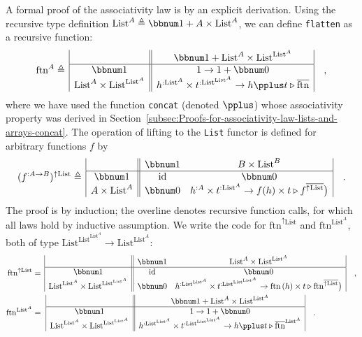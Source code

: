 A formal proof of the associativity law is by an explicit derivation.
Using the recursive type definition $\text{List}^{A}\triangleq\bbnum 1+A\times\text{List}^{A}$,
we can define \lstinline!flatten! as a recursive function:
\[
\text{ftn}^{A}\triangleq\,\begin{array}{|c||c|}
 & \bbnum 1+\text{List}^{A}\times\text{List}^{\text{List}^{A}}\\
\hline \bbnum 1 & 1\rightarrow1+\bbnum 0\\
\text{List}^{A}\times\text{List}^{\text{List}^{A}} & h^{:\text{List}^{A}}\times t^{:\text{List}^{\text{List}^{A}}}\rightarrow h\pplus t\triangleright\overline{\text{ftn}}
\end{array}\quad,
\]
where we have used the function \lstinline!concat! (denoted $\pplus$)
whose associativity property was derived in Section~\ref{subsec:Proofs-for-associativity-law-lists-and-arrays-concat}.
The operation of lifting to the \lstinline!List! functor is defined
for arbitrary functions $f$ by
\[
(f^{:A\rightarrow B})^{\uparrow\text{List}}\triangleq\,\begin{array}{|c||cc|}
 & \bbnum 1 & B\times\text{List}^{B}\\
\hline \bbnum 1 & \text{id} & \bbnum 0\\
A\times\text{List}^{A} & \bbnum 0 & h^{:A}\times t^{:\text{List}^{A}}\rightarrow f(h)\times t\triangleright f^{\overline{\uparrow\text{List}}}\big)
\end{array}\quad.
\]
The proof is by induction; the overline denotes recursive function
calls, for which all laws hold by inductive assumption. We write the
code for $\text{ftn}^{\uparrow\text{List}}$ and $\text{ftn}^{\text{List}^{A}}$,
both of type $\text{List}^{\text{List}^{\text{List}^{A}}}\rightarrow\text{List}^{\text{List}^{A}}$:
\begin{align*}
\text{ftn}^{\uparrow\text{List}} & =\,\begin{array}{|c||cc|}
 & \bbnum 1 & \text{List}^{A}\times\text{List}^{\text{List}^{A}}\\
\hline \bbnum 1 & \text{id} & \bbnum 0\\
\text{List}^{\text{List}^{A}}\times\text{List}^{\text{List}^{\text{List}^{A}}} & \bbnum 0 & h^{:\text{List}^{\text{List}^{A}}}\times t^{:\text{List}^{\text{List}^{\text{List}^{A}}}}\rightarrow\text{ftn}\,(h)\times t\triangleright\text{ftn}^{\overline{\uparrow\text{List}}}\big)
\end{array}\quad,\\
\text{ftn}^{\text{List}^{A}} & =\,\,\begin{array}{|c||c|}
 & \bbnum 1+\text{List}^{A}\times\text{List}^{\text{List}^{A}}\\
\hline \bbnum 1 & 1\rightarrow1+\bbnum 0\\
\text{List}^{\text{List}^{A}}\times\text{List}^{\text{List}^{\text{List}^{A}}} & h^{:\text{List}^{\text{List}^{A}}}\times t^{:\text{List}^{\text{List}^{\text{List}^{A}}}}\rightarrow h\pplus t\triangleright\overline{\text{ftn}}^{\text{List}^{A}}
\end{array}\quad.
\end{align*}
